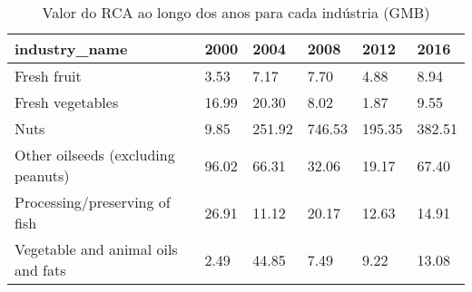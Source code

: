 \begin{table}
\centering
\caption{Valor do RCA ao longo dos anos para cada indústria (GMB)}
\begin{tabular}{p{6cm}p{1.5cm}p{1.5cm}p{1.5cm}p{1.5cm}p{1.5cm}}
\toprule
                     industry\_name &  2000 &   2004 &   2008 &   2012 &   2016 \\
\midrule
                       Fresh fruit &  3.53 &   7.17 &   7.70 &   4.88 &   8.94 \\
                  Fresh vegetables & 16.99 &  20.30 &   8.02 &   1.87 &   9.55 \\
                              Nuts &  9.85 & 251.92 & 746.53 & 195.35 & 382.51 \\
Other oilseeds (excluding peanuts) & 96.02 &  66.31 &  32.06 &  19.17 &  67.40 \\
     Processing/preserving of fish & 26.91 &  11.12 &  20.17 &  12.63 &  14.91 \\
Vegetable and animal oils and fats &  2.49 &  44.85 &   7.49 &   9.22 &  13.08 \\
\bottomrule
\end{tabular}
\end{table}
